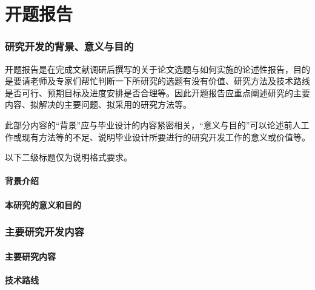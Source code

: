 \part{开题报告} %
\label{prt:开题报告_}
	\setcounter{section}{0}
	\section{研究开发的背景、意义与目的} %
	\label{sec:研究开发的背景_意义与目的}
		开题报告是在完成文献调研后撰写的关于论文选题与如何实施的论述性报告，目的是要请老师及专家们帮忙判断一下所研究的选题有没有价值、研究方法及技术路线是否可行、预期目标及进度安排是否合理等。因此开题报告应重点阐述研究的主要内容、拟解决的主要问题、拟采用的研究方法等。

		此部分内容的“背景”应与毕业设计的内容紧密相关，“意义与目的”可以论述前人工作或现有方法等的不足、说明毕业设计所要进行的研究开发工作的意义或价值等。

		以下二级标题仅为说明格式要求。

		\subsection{背景介绍} %
		\label{sub:背景介绍}
		
		\subsection{本研究的意义和目的} %
		\label{sub:本研究的意义和目的}
		
	\newpage
	\section{主要研究开发内容} %
	\label{sec:主要研究开发内容}
		\subsection{主要研究内容} %
		\label{sub:主要研究内容}
		
		\subsection{技术路线} %
		\label{sub:技术路线}
		
